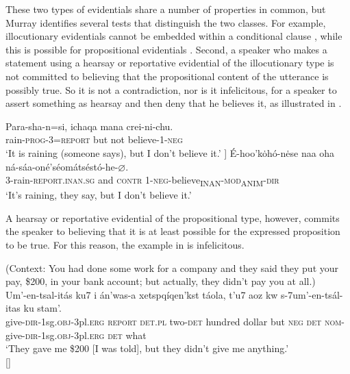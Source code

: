 These two types of evidentials share a number of properties in common, but Murray identifies several tests that distinguish the two classes. For example, illocutionary evidentials cannot be embedded within a conditional clause , while this is possible for propositional evidentials . Second, a speaker who makes a statement using a hearsay or reportative evidential of the illocutionary type is not committed to believing that the propositional content of the utterance is possibly true. So it is not a contradiction, nor is it infelicitous, for a speaker to assert something as hearsay and then deny that he believes it, as illustrated in .


\largerpage
\ea \label{ex:17.11}
\ea  \gll Para-sha-n=si,  ichaqa  mana  crei-ni-chu.\\
rain-\textsc{prog}-3=\textsc{report}  but  not  believe-1-\textsc{neg}\\
\glt ‘It is raining (someone says), but I don’t believe it.’ \newline  [Cuzco \ili{Quechua}; \citet[194]{Faller2002}]
\ex \gll  É-hoo'kȯhó-n\.ese  naa  oha  ná-sáa-oné'séomátséstó-he-⌀.\\
3-rain-\textsc{report}.\textsc{inan.sg}  and  \textsc{contr}  1-\textsc{neg}-believe\textsubscript{INAN}-\textsc{mod\textsubscript{A}}\textsubscript{NIM}-\textsc{dir}\\
\glt ‘It’s raining, they say, but I don’t believe it.’ 
\z \z


A hearsay or reportative evidential of the propositional type, however, commits the speaker to believing that it is at least possible for the expressed proposition to be true. For this reason, the  example in  is infelicitous.


\ea \label{ex:17.12}
(Context: You had done some work for a company and they said they put your pay, \$200, in your bank account; but actually, they didn’t pay you at all.)\\
\gll *Um’-en-tsal-itás  ku7  i  án’was-a  xetspqíqen’kst  táola, t’u7  aoz  kw  s-7um’-en-tsál-itas  ku  stam’.\\
 give-\textsc{dir}-1sg.\textsc{obj}-3pl.\textsc{erg}  \textsc{report}  \textsc{det.pl}  two-\textsc{det}  hundred  dollar but  \textsc{neg}  \textsc{det}  \textsc{nom}-give-\textsc{dir}-1sg.\textsc{obj}-3pl.\textsc{erg}  \textsc{det}  what\\
\glt ‘They gave me \$200 [I was told], but they didn’t give me anything.’\\
   {}[\citealt{MatthewsonEtAl2007}]
\z


